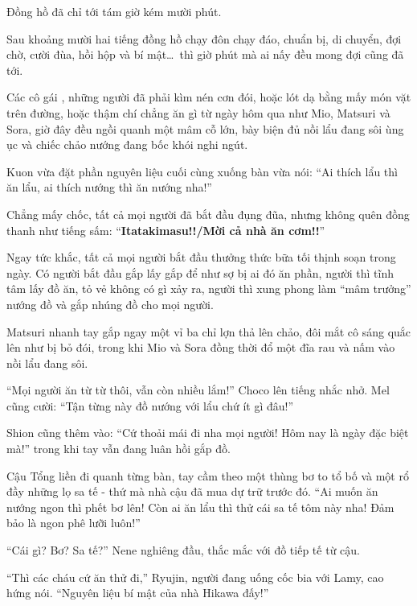 \documentclass[../main.tex]{subfiles}
\begin{document}
\begin{center}
    \uline{}
\end{center}

\ct

Đồng hồ đã chỉ tới tám giờ kém mười phút.

Sau khoảng mười hai tiếng đồng hồ chạy đôn chạy đáo, chuẩn bị, di chuyển, đợi chờ, cười đùa, hồi hộp và bí mật\dots\ thì giờ phút mà ai nấy đều mong đợi cũng đã tới.

Các cô gái \hll, những người đã phải kìm nén cơn đói, hoặc lót dạ bằng mấy món vặt trên đường, hoặc thậm chí chẳng ăn gì từ ngày hôm qua như Mio, Matsuri và Sora, giờ đây đều ngồi quanh một mâm cỗ lớn, bày biện đủ nồi lẩu đang sôi ùng ục và chiếc chảo nướng đang bốc khói nghi ngút.

Kuon vừa đặt phần nguyên liệu cuối cùng xuống bàn vừa nói: ``Ai thích lẩu thì ăn lẩu, ai thích nướng thì ăn nướng nha!''

Chẳng mấy chốc, tất cả mọi người đã bắt đầu đụng đũa, nhưng không quên đồng thanh như tiếng sấm: ``\textbf{Itatakimasu!!/Mời cả nhà ăn cơm!!}''

Ngay tức khắc, tất cả mọi người bắt đầu thưởng thức bữa tối thịnh soạn trong ngày. Có người bắt đầu gắp lấy gắp để như sợ bị ai đó ăn phần, người thì tĩnh tâm lấy đồ ăn, tỏ vẻ không có gì xảy ra, người thì xung phong làm ``mâm trưởng'' nướng đồ và gắp nhúng đồ cho mọi người.

Matsuri nhanh tay gắp ngay một vỉ ba chỉ lợn thả lên chảo, đôi mắt cô sáng quắc lên như bị bỏ đói, trong khi Mio và Sora đồng thời đổ một đĩa rau và nấm vào nồi lẩu đang sôi.

``Mọi người ăn từ từ thôi, vẫn còn nhiều lắm!'' Choco lên tiếng nhắc nhở. Mel cũng cười: ``Tận từng này đồ nướng với lẩu chứ ít gì đâu!''

Shion cũng thêm vào: ``Cứ thoải mái đi nha mọi người! Hôm nay là ngày đặc biệt mà!'' trong khi tay vẫn đang luân hồi gắp đồ.

Cậu Tổng liền đi quanh từng bàn, tay cầm theo một thùng bơ to tổ bố và một rổ đầy những lọ sa tế - thứ mà nhà cậu đã mua dự trữ trước đó. ``Ai muốn ăn nướng ngon thì phết bơ lên! Còn ai ăn lẩu thì thử cái sa tế tôm này nha! Đảm bảo là ngon phê lưỡi luôn!''

``Cái gì? Bơ? Sa tế?'' Nene nghiêng đầu, thắc mắc với đồ tiếp tế từ cậu.

``Thì các cháu cứ ăn thử đi,'' Ryujin, người đang uống cốc bia với Lamy, cao hứng nói. ``Nguyên liệu bí mật của nhà Hikawa đấy!''
\end{document}
